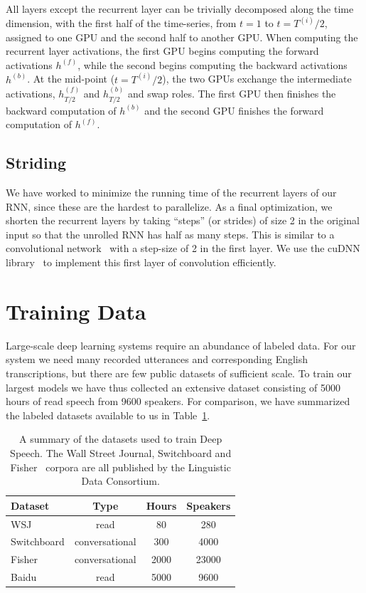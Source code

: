 \documentclass{article}
\begin{document}
All layers except the recurrent layer can be trivially decomposed along the
time dimension, with the first half of the time-series, from $t=1$ to
$t=T^{(i)}/2$, assigned to one GPU and the second half to another GPU.  When
computing the recurrent layer activations, the first GPU begins computing the
forward activations $h^{(f)}$, while the second begins computing the backward
activations $h^{(b)}$.  At the mid-point ($t=T^{(i)}/2$), the two GPUs exchange
the intermediate activations, $h^{(f)}_{T/2}$ and $h^{(b)}_{T/2}$ and swap
roles.  The first GPU then finishes the backward computation of $h^{(b)}$ and
the second GPU finishes the forward computation of $h^{(f)}$.

\subsection{Striding}

We have worked to minimize the running time of the recurrent layers of our RNN,
since these are the hardest to parallelize.  As a final optimization, we
shorten the recurrent layers by taking ``steps'' (or strides) of size 2 in the
original input so that the unrolled RNN has half as many steps.  This is
similar to a convolutional network~\cite{lecun1989convnet} with a step-size of
2 in the first layer.  We use the cuDNN library~\cite{Chetlur:14} to implement
this first layer of convolution efficiently.

\section{Training Data}
\label{section:data}

Large-scale deep learning systems require an abundance of labeled data.  For
our system we need many recorded utterances and corresponding English
transcriptions, but there are few public datasets of sufficient scale.  To
train our largest models we have thus collected an extensive dataset consisting
of 5000 hours of read speech from 9600 speakers.  For comparison, we have
summarized the labeled datasets available to us in Table~\ref{table:datasets}.

\begin{table}[]
\centering
\begin{tabular}{l c c c}
 \toprule
 Dataset & Type & Hours & Speakers  \\
 \midrule
 WSJ         & read           &   80 & 280 \\
 Switchboard & conversational &  300 & 4000 \\
 Fisher      & conversational & 2000 & 23000 \\
 Baidu       &  read          & 5000 & 9600 \\
 \bottomrule
\end{tabular}
\caption{A summary of the datasets used to train Deep Speech. The Wall Street Journal, Switchboard and Fisher~\cite{Cieri2004Fisher} corpora are all published by the Linguistic Data Consortium.}
\label{table:datasets}
\end{table}
\end{document}
